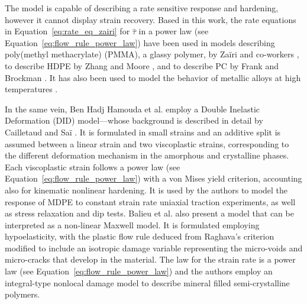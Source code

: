 The model is capable of describing a rate sensitive response and hardening, however it cannot display strain recovery.
Based in this work, the rate equations in Equation~\eqref{eq:rate_eq_zairi} for $\hat \tau$ in a power law (see Equation~\eqref{eq:flow_rule_power_law}) have been used in models describing poly(methyl methacrylate) (PMMA), a glassy polymer, by Zaïri and co-workers \citep{zairiPhenomenologicalNonlinearModelling2005, zairiElastoviscoplasticConstitutiveEquations2007,zairiModellingElastoviscoplasticDamage2008}, to describe HDPE by Zhang and Moore \citep{zhangNonlinearMechanicalResponse1997}, and to describe PC by Frank and Brockman \citep{frankViscoelasticViscoplasticConstitutive2001}.
It has also been used to model the behavior of metallic alloys at high temperatures \citep{desouzanetoComputationalMethodsPlasticity2008}.

In the same vein, Ben Hadj Hamouda et al. \citep{benhadjhamoudaViscoplasticBehaviourMedium2007} employ a Double Inelastic Deformation (DID) model---whose background is described in detail by Cailletaud and Saï \citep{cailletaudStudyPlasticViscoplastic1995}.
It is formulated in small strains and an additive split is assumed between a linear strain and two viscoplastic strains, corresponding to the different deformation mechanism in the amorphous and crystalline phases.
Each viscoplastic strain follows a power law (see Equation~\eqref{eq:flow_rule_power_law}) with a von Mises yield criterion, accounting also for kinematic nonlinear hardening.
It is used by the authors to model the response of MDPE to constant strain rate uniaxial traction experiments, as well as stress relaxation and dip tests.
Balieu et al. \citep{balieuNonassociatedViscoplasticityCoupled2014} also present a model that can be interpreted as a non-linear Maxwell model.
It is formulated employing hypoelasticity, with the plastic flow rule deduced from Raghava's criterion modified to include an isotropic damage variable representing the micro-voids and micro-cracks that develop in the material.
The law for the strain rate is a power law (see Equation~\eqref{eq:flow_rule_power_law}) and the authors employ an integral-type nonlocal damage model to describe mineral filled semi-crystalline polymers.

